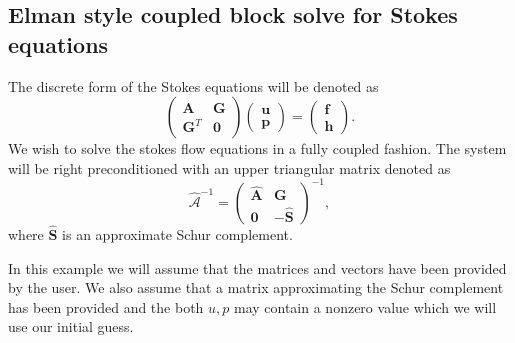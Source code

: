 \documentclass[10pt,a4paper]{amsart}
\renewcommand{\v}[1]{\boldsymbol{#1}}		%
\newcommand{\m}[1]{\boldsymbol{#1}}		%
\newcommand{\code}[1]{{\fontfamily{txtt}\selectfont {#1}}}
\begin{document}
	\subsection{Elman style coupled block solve for Stokes equations}
The discrete form of the Stokes equations will be denoted as
\begin{equation}
\begin{pmatrix}
	\m A		&\m G \\
	\m G^T	&\m 0
\end{pmatrix}
\begin{pmatrix}
	\v u	\\
	\v p	
\end{pmatrix}
=
\begin{pmatrix}
	\v f	\\
	\v h	
\end{pmatrix}.
\end{equation}
We wish to solve the stokes flow equations in a fully coupled fashion. The system will be right preconditioned with an upper triangular matrix denoted as
\begin{equation}
\hat{\mathcal A}^{-1} = 
\begin{pmatrix}
	\hat{\m A}		&\m G \\
	\m 0			&-\hat{\m S}
\end{pmatrix}^{-1},
\end{equation}
where $\hat{\m S}$ is an approximate Schur complement.

In this example we will assume that the matrices \code{A, G} and vectors \code{u,p,f,h} have been provided by the user. We also assume that a matrix approximating the Schur complement \code{s\_hat} has been provided and the both $u,p$ may contain a nonzero value which we will use our initial guess.
\end{document}
